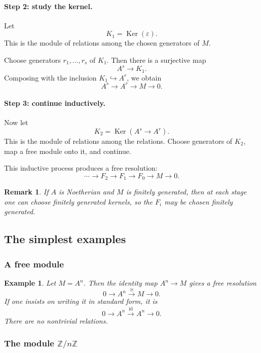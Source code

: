 \documentclass[12pt,a4paper]{article}
\theoremstyle{notespace}
\newtheorem{remark}{Remark}[section]
\newtheorem{example}[definition]{Example}
\newcommand{\kerf}{\operatorname{Ker}}
\newcommand{\ZZ}{\mathbb{Z}}
\begin{document}
\paragraph{Step 2: study the kernel.}

Let
\[
K_1=\kerf(\varepsilon).
\]
This is the module of relations among the chosen generators of \(M\).

Choose generators \(r_1,\dots,r_s\) of \(K_1\). Then there is a surjective map
\[
A^s \to K_1.
\]
Composing with the inclusion \(K_1\hookrightarrow A^r\), we obtain
\[
A^s \to A^r \to M \to 0.
\]

\paragraph{Step 3: continue inductively.}

Now let
\[
K_2=\kerf(A^s\to A^r).
\]
This is the module of relations among the relations. Choose generators of \(K_2\), map a free module onto it, and continue.

This inductive process produces a free resolution:
\[
\cdots \to F_2\to F_1\to F_0\to M\to 0.
\]

\begin{remark}
	If \(A\) is Noetherian and \(M\) is finitely generated, then at each stage one can choose finitely generated kernels, so the \(F_i\) may be chosen finitely generated.
\end{remark}

\subsection{The simplest examples}

\subsubsection{A free module}

\begin{example}
	Let \(M=A^n\). Then the identity map \(A^n\to M\) gives a free resolution
	\[
	0\longrightarrow A^n \xrightarrow{\cong} M \longrightarrow 0.
	\]
	If one insists on writing it in standard form, it is
	\[
	0\longrightarrow A^n \xrightarrow{\mathrm{id}} A^n \longrightarrow 0.
	\]
	There are no nontrivial relations.
\end{example}

\subsubsection{The module \(\ZZ/n\ZZ\)}
\end{document}
